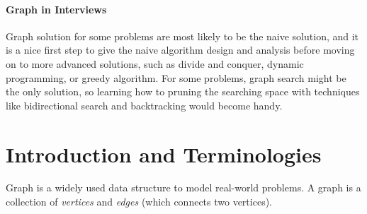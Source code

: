 \documentclass[../main.tex]{subfiles}
\begin{document}

\paragraph{Graph in Interviews} Graph solution for some problems are most likely to be the naive solution, and it is a nice first step to give the naive algorithm design and analysis before moving on to more advanced solutions, such as divide and conquer, dynamic programming, or greedy algorithm. For some problems, graph search might be the only solution, so learning how to pruning the searching space with techniques like bidirectional search and backtracking would become handy. 

\section{Introduction and Terminologies}
\label{graph_terminology}
Graph is a widely used data structure to model real-world problems. A graph  is a collection of \textit{vertices} and \textit{edges} (which connects two vertices). 



\end{document}
